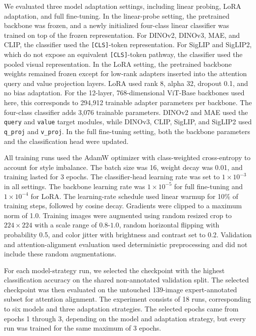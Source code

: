 \documentclass[lineno,pdflatex,sn-mathphys-num]{sn-jnl}%
\theoremstyle{thmstyleone}%
\theoremstyle{thmstyletwo}%
\theoremstyle{thmstylethree}%
\begin{document}
We evaluated three model adaptation settings, including linear probing, LoRA adaptation, and full fine-tuning. In the linear-probe setting, the pretrained backbone was frozen, and a newly initialized four-class linear classifier was trained on top of the frozen representation. For DINOv2, DINOv3, MAE, and CLIP, the classifier used the \texttt{[CLS]}-token representation. For SigLIP and SigLIP2, which do not expose an equivalent \texttt{[CLS]}-token pathway, the classifier used the pooled visual representation. In the LoRA setting, the pretrained backbone weights remained frozen except for low-rank adapters inserted into the attention query and value projection layers. LoRA used rank 8, alpha 32, dropout 0.1, and no bias adaptation. For the 12-layer, 768-dimensional ViT-Base backbones used here, this corresponds to 294,912 trainable adapter parameters per backbone. The four-class classifier adds 3,076 trainable parameters. DINOv2 and MAE used the \texttt{query} and \texttt{value} target modules, while DINOv3, CLIP, SigLIP, and SigLIP2 used \texttt{q\_proj} and \texttt{v\_proj}. In the full fine-tuning setting, both the backbone parameters and the classification head were updated.

All training runs used the AdamW optimizer with class-weighted cross-entropy to account for style imbalance. The batch size was 16, weight decay was 0.01, and training lasted for 3 epochs. The classifier-head learning rate was set to $1 \times 10^{-3}$ in all settings. The backbone learning rate was $1 \times 10^{-5}$ for full fine-tuning and $1 \times 10^{-4}$ for LoRA. The learning-rate schedule used linear warmup for 10\% of training steps, followed by cosine decay. Gradients were clipped to a maximum norm of 1.0. Training images were augmented using random resized crop to $224 \times 224$ with a scale range of $0.8$-$1.0$, random horizontal flipping with probability 0.5, and color jitter with brightness and contrast set to 0.2. Validation and attention-alignment evaluation used deterministic preprocessing and did not include these random augmentations.

For each model-strategy run, we selected the checkpoint with the highest classification accuracy on the shared non-annotated validation split. The selected checkpoint was then evaluated on the untouched 139-image expert-annotated subset for attention alignment. The experiment consists of 18 runs, corresponding to six models and three adaptation strategies. The selected epochs came from epochs 1 through 3, depending on the model and adaptation strategy, but every run was trained for the same maximum of 3 epochs.
\end{document}
